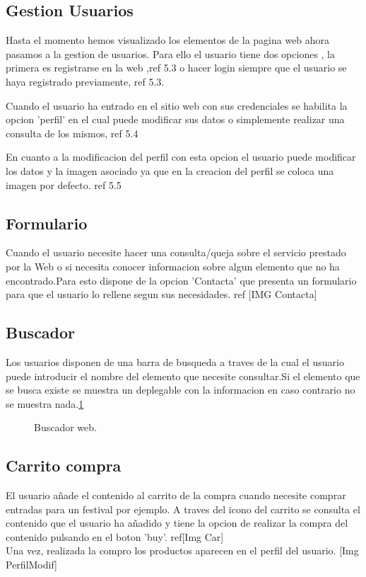 \subsection{Gestion Usuarios}
Hasta el momento hemos visualizado los elementos de la pagina web ahora pasamos a la gestion  de usuarios. Para ello el usuario tiene dos opciones , la primera es registrarse en la web ,ref 5.3  o hacer login siempre que el usuario se haya registrado previamente, ref 5.3.

Cuando el usuario ha entrado en el sitio web con sus credenciales se habilita la opcion 'perfil' en el cual puede modificar sus datos o simplemente realizar una consulta de los mismos, ref 5.4

En cuanto a la modificacion del perfil con esta opcion el usuario puede modificar los datos  y la imagen asociado ya que en la creacion del perfil se coloca una imagen por defecto. ref 5.5
\subsection{Formulario}
Cuando el usuario necesite hacer una consulta/queja sobre el servicio prestado por la Web o si necesita conocer informacion sobre algun elemento que no ha encontrado.Para esto dispone de la opcion 'Contacta' que presenta un formulario para que el usuario lo rellene segun sus necesidades. ref [IMG Contacta]
\subsection{Buscador}
Los usuarios disponen de una barra de busqueda a traves de la cual el usuario puede introducir el nombre del elemento que necesite consultar.Si el elemento que se busca existe  se muestra un deplegable con la informacion en caso contrario no se muestra nada.\ref{fig:Buscador web}
\begin{figure}[htbp]
\centering
{}
\caption{Buscador web.} \label{fig:Buscador web}
\end{figure}
\subsection{Carrito compra}
El usuario añade el contenido al carrito de la compra cuando necesite comprar entradas para un festival por ejemplo. A traves del icono del carrito se consulta el contenido que el usuario ha añadido y tiene la opcion de realizar la compra del contenido pulsando en el boton 'buy'. ref[Img Car]
\\Una vez, realizada la compro los productos  aparecen en el perfil del usuario. [Img PerfilModif]



